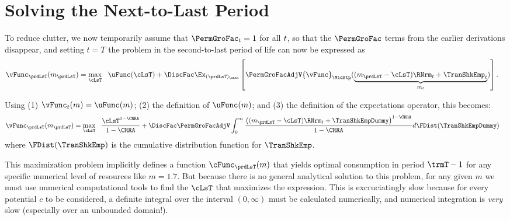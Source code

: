 
\hypertarget{solving-the-next-to-last-period}{}
\hypertarget{solving-the-next}{}
\section{Solving the Next-to-Last Period}\label{sec:solving-the-next}

To reduce clutter, we now temporarily assume that $\PermGroFac_{\prd}=1$ for all $t$, so that the $\PermGroFac$ terms from the earlier derivations disappear, and setting $t=T$ the problem in the second-to-last period of life can now be expressed as
\begin{equation*}\begin{gathered}\begin{aligned}
      {\vFunc}_{\prdLsT}({m}_{\prdLsT})  & = \max_{\cLsT} ~~ \uFunc(\cLsT) +
      \DiscFac \Ex_{({\prdLsT})_\cntn} \left[\PermGroFacAdjV{\vFunc}_{\MidStp}(\underbrace{({m}_{\prdLsT}-\cLsT)\RNrm_{\prdT} + \TranShkEmp_{\prdT}}_{{m}_{\prdT}})\right].
    \end{aligned}\end{gathered}\end{equation*}

Using (1) $\vFunc_{\prdT}({m})=\uFunc({m})$; (2) the definition of $\uFunc({m})$; and (3) the definition of the expectations operator, this becomes: %
\begin{equation*}\begin{gathered}\begin{aligned}
      {\vFunc}_{\prdLsT}({m}_{\prdLsT})   & = \max_{\cLsT} ~~
      \frac{\cLsT^{1-\CRRA}}{1-\CRRA} + \DiscFac \PermGroFacAdjV\int_{0}^{\infty}
      \frac{\left(({m}_{\prdLsT}-\cLsT)\RNrm_{\prdT}+ \TranShkEmpDummy\right)^{1-\CRRA}}{1-\CRRA}
      d\FDist(\TranShkEmpDummy)
    \end{aligned}\end{gathered}\end{equation*}
where $\FDist(\TranShkEmp)$ is the cumulative distribution function for ${\TranShkEmp}$.

\lstset{basicstyle=\ttfamily\footnotesize,breaklines=true,language=Python,frame=single}


This maximization problem implicitly defines a function $\cFunc_{\prdLsT}({m})$ that yields optimal consumption in period $\trmT-1$ for any specific numerical level of resources like ${m}=1.7$.  But because there is no general analytical solution to this problem, for any given ${m}$ we must use numerical computational tools to find the $\cLsT$ that maximizes the expression.  This is excruciatingly slow because for every potential ${c}$ to be considered, a definite integral over the interval $(0,\infty)$ must be calculated numerically, and numerical integration is \textit{very} slow (especially over an unbounded domain!).

